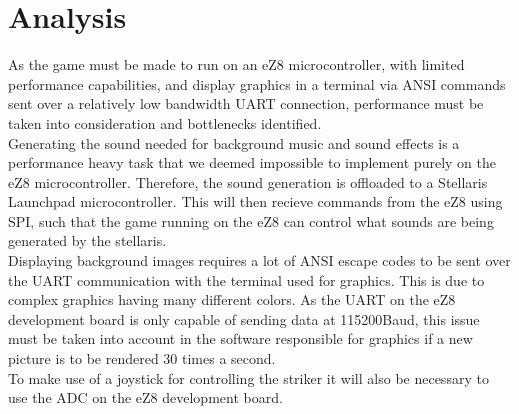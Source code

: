 \section{Analysis}
As the game must be made to run on an eZ8 microcontroller, with limited performance capabilities, and display graphics in a terminal
 via ANSI commands sent over a relatively low bandwidth UART connection, performance must be taken into consideration and bottlenecks identified. \\

Generating the sound needed for background music and sound effects is a performance heavy task that we deemed
impossible to implement purely on the eZ8 microcontroller.
Therefore, the sound generation is offloaded to a Stellaris Launchpad microcontroller. 
This will then recieve commands from the eZ8 using SPI, such that the game running on the eZ8 can control
what sounds are being generated by the stellaris.\\

Displaying background images requires a lot of ANSI escape codes to be sent over the UART communication with
the terminal used for graphics. This is due to complex graphics having many different colors. As the UART on the eZ8 
development board is only capable of sending data at 115200Baud, this issue must be taken into account
in the software responsible for graphics if a new picture is to be rendered 30 times a second. \\

To make use of a joystick for controlling the striker it will also be necessary to use the ADC on the eZ8 development
board. 





